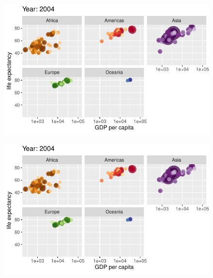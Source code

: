 \documentclass[
  letterpaper,
  DIV=11,
  numbers=noendperiod]{scrartcl}
\begin{document}
\begin{figure}[H]

{\centering \includegraphics{class05_files/figure-pdf/unnamed-chunk-24-94.pdf}

}

\end{figure}

\begin{figure}[H]

{\centering \includegraphics{class05_files/figure-pdf/unnamed-chunk-24-95.pdf}

}

\end{figure}
\end{document}
